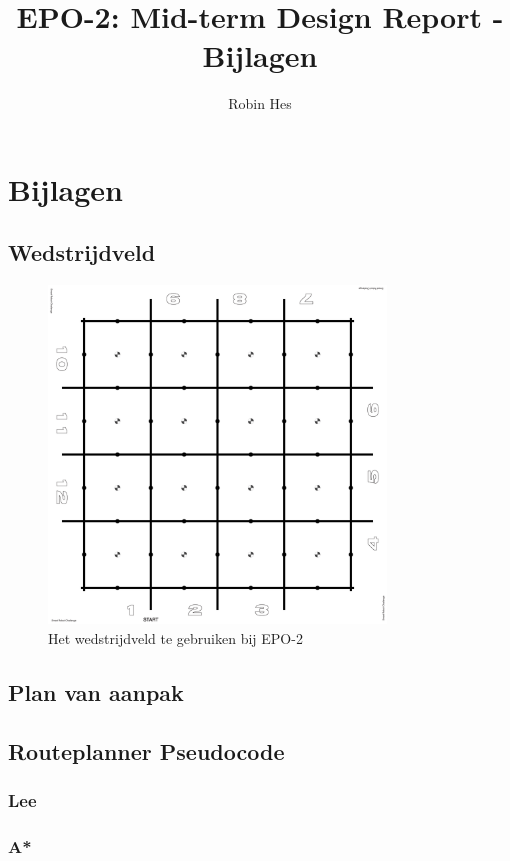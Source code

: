 \documentclass{report}
\title{EPO-2: Mid-term Design Report - Bijlagen}
\author{Robin Hes}
\begin{document}
\chapter{Bijlagen}
\label{ch:bijlagen}

\section{Wedstrijdveld}
\label{sec:field}

\begin{figure}[H]
	\centering
	\includegraphics[width=0.8\textwidth]{competitionField2440x2440-rc.pdf}
	\caption{Het wedstrijdveld te gebruiken bij EPO-2}
	\label{fig:field}
\end{figure}

\newpage
\section{Plan van aanpak}
\label{sec:pva}



 \section{Routeplanner Pseudocode}
 \label{sec:pseudocode}

\subsection{Lee}
\label{ssec:pseudocode-lee}

\subsection{A*}
\label{ssec:pseudocode-astar}
\end{document}

